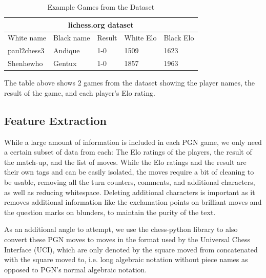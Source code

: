 \documentclass[conference]{IEEEtran}
\begin{document}
\begin{table}[htbp]
\vspace{.01cm}
\caption{Example Games from the Dataset}
\begin{center}
\begin{tabular}{|lllll|}
\hline
\multicolumn{5}{|c|}{lichess.org dataset}                                                                                                      \\ \hline
\multicolumn{1}{|l|}{White name}  & \multicolumn{1}{l|}{Black name} & \multicolumn{1}{l|}{Result} & \multicolumn{1}{l|}{White Elo} & Black Elo \\ \hline
\multicolumn{1}{|l|}{paul2chess3} & \multicolumn{1}{l|}{Andique}    & \multicolumn{1}{l|}{1-0}    & \multicolumn{1}{l|}{1509}      & 1623      \\ \hline
\multicolumn{1}{|l|}{Shenhewho}   & \multicolumn{1}{l|}{Gentux}     & \multicolumn{1}{l|}{1-0}    & \multicolumn{1}{l|}{1857}      & 1963      \\ \hline
\end{tabular}
\begin{minipage}{8cm}
    \vspace{0.1cm}
    \small The table above shows 2 games from the dataset showing the player names, the result of the game, and each player's Elo rating.
\end{minipage}
\end{center}
\label{table:example-games}
\end{table}

\subsection{Feature Extraction}

While a large amount of information is included in each PGN game, we only need a certain subset of data from each: The Elo ratings of the players, the result of the match-up, and the list of moves. While the Elo ratings and the result are their own tags and can be easily isolated, the moves require a bit of cleaning to be usable, removing all the turn counters, comments, and additional characters, as well as reducing whitespace. Deleting additional characters is important as it removes additional information like the exclamation points on brilliant moves and the question marks on blunders, to maintain the purity of the text.

As an additional angle to attempt, we use the chess-python library to also convert these PGN moves to moves in the format used by the Universal Chess Interface (UCI), which are only denoted by the square moved from concatenated with the square moved to, i.e. long algebraic notation without piece names as opposed to PGN's normal algebraic notation.
\end{document}
